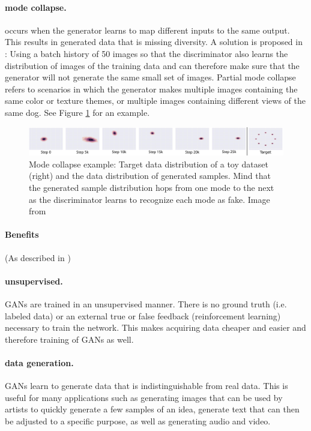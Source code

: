 \paragraph{mode collapse.} occurs when the generator learns to map different inputs to the same output. This results in generated data that is missing diversity. A solution is proposed in \cite{DBLP:journals/corr/ZhuPIE17}: Using a batch history of 50 images so that the discriminator also learns the distribution of images of the training data and can therefore make sure that the generator will not generate the same small set of images. Partial mode collapse refers to scenarios in which the generator makes multiple images containing the same color or texture themes, or multiple images containing different views of the same dog. See Figure \ref{fig:mode_collapse} for an example.

\begin{figure}
	\centering
	\includegraphics[width=\textwidth]{images/metz_et_al_mode_collapse.png}
	\caption{Mode collapse example: Target data distribution of a toy dataset (right) and the data distribution of generated samples. Mind that the generated sample distribution hops from one mode to the next as the discriminator learns to recognize each mode as fake. Image from \cite{DBLP:journals/corr/MetzPPS16}}
	\label{fig:mode_collapse}
\end{figure}

\paragraph{Benefits} (As described in \cite{GAN_Projects})
\paragraph{unsupervised.} GANs are trained in an unsupervised manner. There is no ground truth (i.e. labeled data) or an external true or false feedback (reinforcement learning) necessary to train the network. This makes acquiring data cheaper and easier and therefore training of GANs as well. 

\paragraph{data generation.} GANs learn to generate data that is indistinguishable from real data. This is useful for many applications such as generating images that can be used by artists to quickly generate a few samples of an idea, generate text that can then be adjusted to a specific purpose, as well as generating audio and video.

